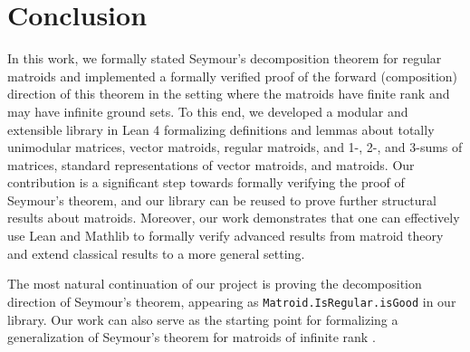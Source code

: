 \section{Conclusion}

In this work, we formally stated Seymour's decomposition theorem for regular matroids and implemented a formally verified proof of the forward (composition) direction of this theorem in the setting where the matroids have finite rank and may have infinite ground sets. To this end, we developed a modular and extensible library in Lean 4 formalizing definitions and lemmas about totally unimodular matrices, vector matroids, regular matroids, and 1-, 2-, and 3-sums of matrices, standard representations of vector matroids, and matroids. Our contribution is a significant step towards formally verifying the proof of Seymour's theorem, and our library can be reused to prove further structural results about matroids. Moreover, our work demonstrates that one can effectively use Lean and Mathlib to formally verify advanced results from matroid theory and extend classical results to a more general setting.

The most natural continuation of our project is proving the decomposition direction of Seymour's theorem, appearing as \texttt{Matroid.IsRegular.isGood} in our library. Our work can also serve as the starting point for formalizing a generalization of Seymour's theorem for matroids of infinite rank \cite{Bowler2013}.

